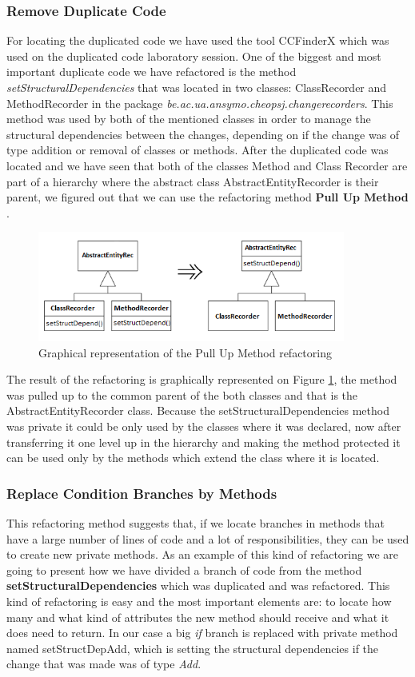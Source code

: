 \documentclass[a4paper]{article}
\begin{document}
\subsubsection{Remove Duplicate Code}
For locating the duplicated code we have used the tool CCFinderX which was used on the duplicated code laboratory session. One of the biggest and most important duplicate code we have refactored is the method \emph{setStructuralDependencies} that was located in two classes: ClassRecorder and MethodRecorder in the package \emph{be.ac.ua.ansymo.cheopsj.changerecorders}. This method was used by both of the mentioned classes in order to manage the structural dependencies between the changes, depending on if the change was of type addition or removal of classes or methods.
After the duplicated code was located and we have seen that both of the classes Method and Class Recorder are part of a hierarchy where the abstract class AbstractEntityRecorder is their parent, we figured out that we can use the refactoring method \textbf{Pull Up Method} \cite{sourcemaking}.

\begin{figure}[h]
\centering
\includegraphics[width=0.9\textwidth]{Images/PullUpMethod}
\caption{Graphical representation of the Pull Up Method refactoring}
\label{fig:PullUp}
\end{figure}

The result of the refactoring is graphically represented on Figure \ref{fig:PullUp}, the method was pulled up to the common parent of the both classes and that is the AbstractEntityRecorder class. Because the setStructuralDependencies method was private it could be only used by the classes where it was declared, now after transferring it one level up in the hierarchy and making the method protected it can be used only by the methods which extend the class where it is located.

\subsubsection{Replace Condition Branches by Methods}
This refactoring method suggests that, if we locate branches in methods that have a large number of lines of code and a lot of responsibilities, they can be used to create new private methods. As an example of this kind of refactoring we are going to present how we have divided a branch of code from the method \textbf{setStructuralDependencies} which was duplicated and was refactored. This kind of refactoring is easy and the most important elements are: to locate how many and what kind of attributes the new method should receive and what it does need to return. In our case a big \emph{if} branch is replaced with private method named setStructDepAdd, which is setting the structural dependencies if the change that was made was of type \emph{Add}.
\end{document}
